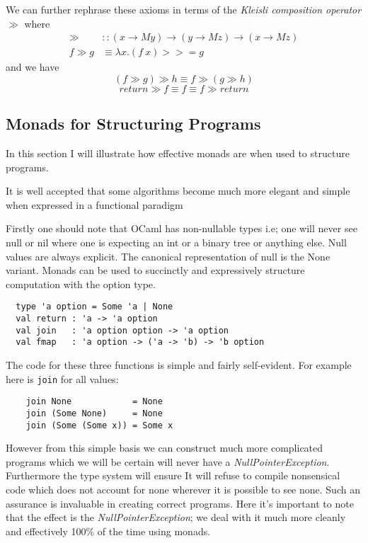 We can further rephrase these axioms in terms
of the \textit{Kleisli composition operator} $\gg$ where
\begin{align}
    \gg &:: (x \rightarrow M y) \rightarrow (y \rightarrow M z) \rightarrow (x \rightarrow M z) \\
    f \gg g &\equiv \lambda x. (f\ x) >>= g
\end{align}
and we have
\begin{equation}
    (f \gg g) \gg h \equiv f \gg (g \gg h)
\end{equation}
\begin{equation}
    return \gg f \equiv f \equiv f \gg return
\end{equation}

\subsection{Monads for Structuring Programs}
In this section I will illustrate how effective monads are when used to structure programs.

It is well accepted that some algorithms become much more elegant
and simple when expressed in a functional paradigm

Firstly one should note that OCaml has non-nullable types
i.e; one will never see null or nil where one is expecting an
int or a binary tree or anything else.
Null values are always explicit.
The canonical representation of null is the None variant.
Monads can be used to succinctly and expressively structure computation with the option type.

\begin{verbatim}
  type 'a option = Some 'a | None
  val return : 'a -> 'a option
  val join   : 'a option option -> 'a option
  val fmap   : 'a option -> ('a -> 'b) -> 'b option
\end{verbatim}

The code for these three functions is simple and fairly self-evident.
For example here is \texttt{join} for all values:
\begin{verbatim}
    join None            = None
    join (Some None)     = None
    join (Some (Some x)) = Some x
\end{verbatim}

However from this simple basis we can construct much more complicated programs which we
will be certain will never have a \textit{NullPointerException}.
Furthermore the type system will ensure 
It will refuse to compile nonsensical code which does not account for none
wherever it is possible to see none.
Such an assurance is invaluable in creating correct programs.
Here it's important to note that the effect is the \textit{NullPointerException};
we deal with it much more cleanly and effectively 100\% of the time using monads.

